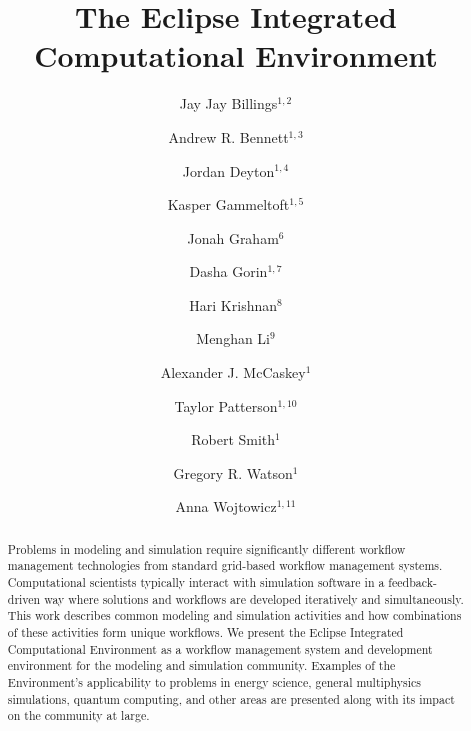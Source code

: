\documentclass{elsart}
\begin{document}
\begin{frontmatter}

\title{The Eclipse Integrated Computational Environment}

\author{Jay Jay Billings$^{1,2}$}
\author{Andrew R. Bennett$^{1,3}$}
\author{Jordan Deyton$^{1,4}$}
\author{Kasper Gammeltoft$^{1,5}$}
\author{Jonah Graham$^{6}$}
\author{Dasha Gorin$^{1,7}$}
\author{Hari Krishnan$^{8}$}
\author{Menghan Li$^{9}$}
\author{Alexander J. McCaskey$^{1}$}
\author{Taylor Patterson$^{1,10}$}
\author{Robert Smith$^{1}$}
\author{Gregory R. Watson$^{1}$}
\author{Anna Wojtowicz$^{1,11}$}

\address{$^{1}$Computer Science and Mathematics Division, Oak Ridge National
Laboratory, Oak Ridge, TN 37830, USA}
\address{$^{2}$The Bredesen Center for Interdisciplinary Research and Graduate
Education, University of Tennessee, 444 Greve Hall, 821 Volunteer
  Blvd. Knoxville, TN 37996-3394}
\address{$^{3}$University of Washington, Seattle, WA 98105}
\address{$^{4}$General Electric Company, 3200 North Grandview Blvd Waukesha, WI
53188-1678}
\address{$^{5}$Georgia Institute of Technology North Avenue, Atlanta, GA 30332}
\address{$^{6}$Kichwa Coders Ltd., 1 Plomer Green Avenue Downley, High Wycombe
HP13 5LN United Kingdom}
\address{$^{7}$Northwestern University, 633 Clark Street Evanston, IL 60208}
\address{$^{8}$Lawrence Berkeley National Laboratory, 1 Cyclotron Rd, Berkeley,
CA 94720}
\address{$^{9}$Department of Computer Science and Department of Biological
Sciences, Purdue University, West Lafayette, IN 47906} 
\address{$^{10}$Acato Information Management, LLC, 114 Union Valley Rd., Oak Ridge,
TN 37830}
\address{$^{11}$Colorado State University, Fort Collins, CO 80523}

\begin{abstract}

Problems in modeling and simulation require significantly different
workflow management technologies from standard grid-based workflow
management systems. Computational scientists typically interact with
simulation software in a feedback-driven way where solutions and
workflows are developed iteratively and simultaneously. This work
describes common modeling and simulation activities and how combinations of these
activities form unique workflows. We present the Eclipse Integrated
Computational Environment as a workflow management system and
development environment for the modeling and simulation community.
Examples of the Environment's applicability to problems in energy
science, general multiphysics simulations, quantum computing, and other
areas are presented along with its impact on the community at large.


\end{abstract}
\end{frontmatter}
\end{document}
